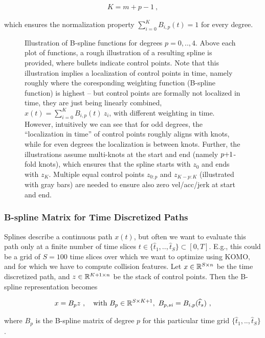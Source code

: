 $$\begin{align}
    K = m+p-1 ~,
\end{align}$$

which ensures the normalization property $\sum_{i=0}^K B_{i,p}(t) = 1$ for every degree.

\begin{figure}

\caption{
Illustration of B-spline functions for degrees $p=0,..,4$. Above each
plot of functions, a rough illustration of a resulting spline is
provided, where bullets indicate control points. Note that this
illustration implies a localization of control points in time, namely
roughly where the coresponding weighting function (B-spline function)
is highest -- but control points are formally not localized in time,
they are just being linearly combined, $x(t) = \sum_{i=0}^K
B_{i,p}(t)~ z_i$, with different weighting in time. However,
intuitively we can see that for odd degrees, the ``localization in
time'' of control points roughly aligns with knots, while for even
degrees the localization is between knots. Further, the illustrations
assume multi-knots at the start and end (namely $p{{\hspace*{-.0pt}\text{\rm +}\hspace*{-.5pt}}1}$-fold knots),
which ensures that the spline starts with $z_0$ and ends with
$z_K$. Multiple equal control points $z_{0:p}$ and $z_{K-p:K}$
(illustrated with gray bars) are needed to ensure also zero
vel/acc/jerk at start and end.
}
\end{figure}

\subsubsection{B-spline Matrix for Time Discretized Paths}

Splines describe a continuous path $x(t)$, but often we want to evaluate this path only at a finite number of time slices $t\in \{\hat t_1,..,\hat t_S\} \subset [0,T]$. E.g., this could be a grid of $S=100$ time slices over which we want to optimize using KOMO, and for which we have to compute collision features. Let $x \in {\mathbb{R}}^{S \times n}$ be the time discretized path, and $z \in{\mathbb{R}}^{K{{\hspace*{-.0pt}\text{\rm +}\hspace*{-.5pt}}1}\times n}$ be the stack of control points. Then the B-spline representation becomes

$$\begin{align}
x = B_p z ~,\quad \text{with } B_p\in{\mathbb{R}}^{S\times K{{\hspace*{-.0pt}\text{\rm +}\hspace*{-.5pt}}1}},~ B_{p,si} = B_{i,p}(\widehat t_s) ~,
\end{align}$$

where $B_p$ is the B-spline matrix of degree $p$ for this particular time grid $\{\hat t_1,..,\hat t_S\}$.

